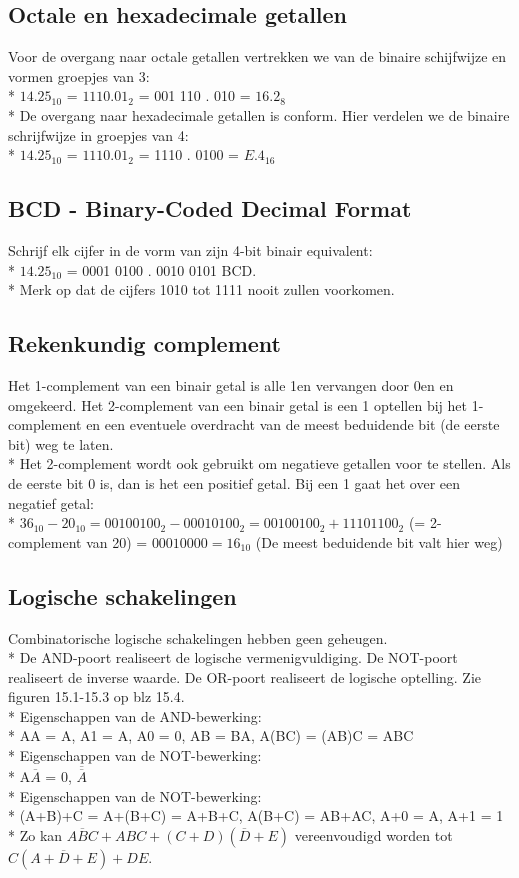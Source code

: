 \documentclass[10pt]{article}
\begin{document}
\subsection{Octale en hexadecimale getallen}
Voor de overgang naar octale getallen vertrekken we van de binaire schijfwijze en vormen groepjes van 3:\\*
$14.25_{10}$ = $1110.01_2$ = 001 110 . 010 = $16.2_8$\\*
De overgang naar hexadecimale getallen is conform. Hier verdelen we de binaire schrijfwijze in groepjes van 4:\\*
$14.25_{10}$ = $1110.01_2$ = 1110 . 0100 = $E.4_{16}$
\subsection{BCD - Binary-Coded Decimal Format}
Schrijf elk cijfer in de vorm van zijn 4-bit binair equivalent:\\*
$14.25_{10}$ = 0001 0100 . 0010 0101 BCD.\\*
Merk op dat de cijfers 1010 tot 1111 nooit zullen voorkomen.
\subsection{Rekenkundig complement}
Het 1-complement van een binair getal is alle 1en vervangen door 0en en omgekeerd. Het 2-complement van een binair getal is een 1 optellen bij het 1-complement en een eventuele overdracht van de meest beduidende bit (de eerste bit) weg te laten.\\*
Het 2-complement wordt ook gebruikt om negatieve getallen voor te stellen. Als de eerste bit 0 is, dan is het een positief getal. Bij een 1 gaat het over een negatief getal:\\*
$36_{10} - 20_{10} = 00100100_2 - 00010100_2 = 00100100_2 + 11101100_2$ (= 2-complement van 20) = $00010000 = 16_{10}$ (De meest beduidende bit valt hier weg)
\subsection{Logische schakelingen}
Combinatorische logische schakelingen hebben geen geheugen.\\*
De AND-poort realiseert de logische vermenigvuldiging. De NOT-poort realiseert de inverse waarde. De OR-poort realiseert de logische optelling. Zie figuren 15.1-15.3 op blz 15.4.\\*
Eigenschappen van de AND-bewerking:\\*
AA = A, A1 = A, A0 = 0, AB = BA, A(BC) = (AB)C = ABC\\*
Eigenschappen van de NOT-bewerking:\\*
A$\overline{A}$ = 0, $\overline{\overline{A}}$\\*
Eigenschappen van de NOT-bewerking:\\*
(A+B)+C = A+(B+C) = A+B+C, A(B+C) = AB+AC, A+0 = A, A+1 = 1\\*
{\scriptsize Zo kan $A\overline{B}C+ABC+(C+D)(\overline{D}+E)$ vereenvoudigd worden tot $C(A+\overline{D}+E)+DE$.}
\end{document}
